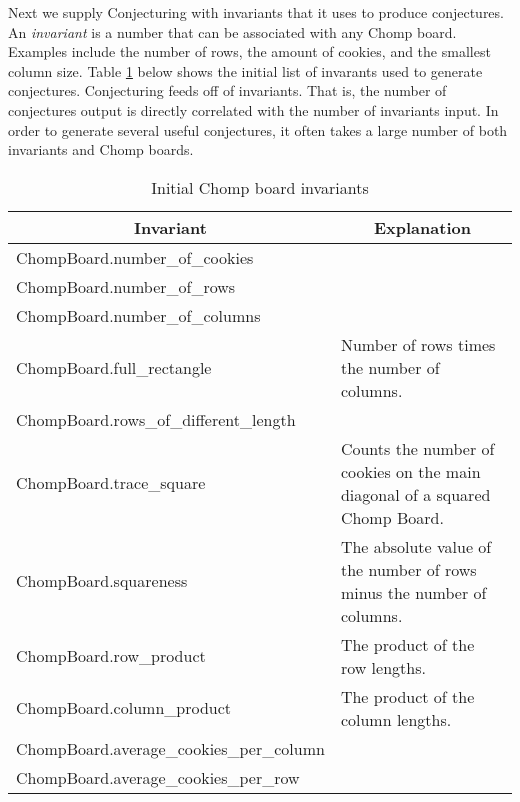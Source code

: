 \documentclass{amsart}
\theoremstyle{definition}
\theoremstyle{remark}
\numberwithin{equation}{section}
\begin{document}




Next we supply Conjecturing with invariants that it uses to produce conjectures.  An \textit{invariant} is a number that can be associated with any Chomp board.  Examples include the number of rows, the amount of cookies, and the smallest column size.  Table \ref{initial_invariants} below shows the initial list of invarants used to generate conjectures.
\indent Conjecturing feeds off of invariants.  That is, the number of conjectures output is directly correlated with the number of invariants input.  In order to generate several useful conjectures, it often takes a large number of both invariants and Chomp boards.


\begin{table}[h]
\centering
\begin{tabular}{@{}|l|p{7cm}|@{}}
\toprule
\multicolumn{1}{|c|}{{\bf Invariant}} & \multicolumn{1}{c|}{{\bf Explanation}} \\ \midrule
ChompBoard.number\_of\_cookies &  \\
\hline
ChompBoard.number\_of\_rows &  \\
\hline
ChompBoard.number\_of\_columns &  \\
\hline
ChompBoard.full\_rectangle & Number of rows times the number of columns. \\
\hline
ChompBoard.rows\_of\_different\_length &  \\
\hline
ChompBoard.trace\_square & Counts the number of cookies on the main diagonal of a squared Chomp Board. \\
\hline
ChompBoard.squareness & The absolute value of the number of rows minus the number of columns. \\
\hline
ChompBoard.row\_product & The product of the row lengths. \\
\hline
ChompBoard.column\_product & The product of the column lengths. \\
\hline
ChompBoard.average\_cookies\_per\_column &  \\
\hline
ChompBoard.average\_cookies\_per\_row &\\
\hline
\end{tabular}
\caption{Initial Chomp board invariants}
\label{initial_invariants}
\end{table}
\end{document}

